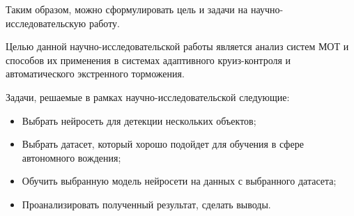 Таким образом, можно сформулировать цель и задачи на научно-исследовательскую работу. 

Целью данной научно-исследовательской работы является анализ систем МОТ и способов их применения в системах адаптивного круиз-контроля и автоматического экстренного торможения.

Задачи, решаемые в рамках научно-исследовательской следующие:

\begin{itemize}

	\item Выбрать нейросеть для детекции нескольких объектов;

	\item Выбрать датасет, который хорошо подойдет для обучения в сфере автономного вождения;
	
 	\item Обучить выбранную модель нейросети на данных с выбранного датасета;
	
	\item Проанализировать полученный результат, сделать выводы.
	
\end{itemize}

